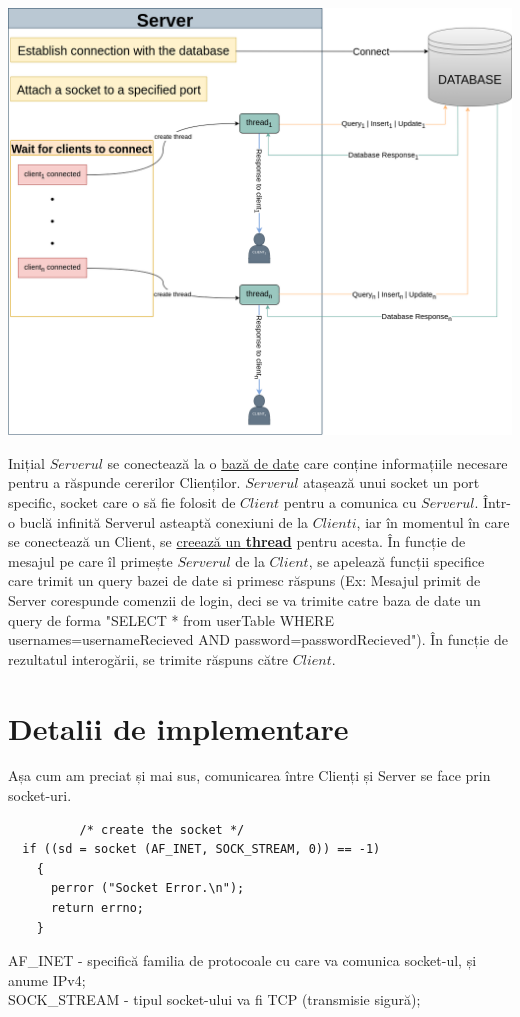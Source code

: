 \documentclass[runningheads]{llncs}
\begin{document}
\begin{center}
\includegraphics[scale=0.4]{diagram_server.png}
\label{sec:server}
\end{center}
Inițial $Serverul$ se conectează la o \hyperref[sec:ServerDataBase]{bază de date} care conține informațiile necesare pentru a răspunde cererilor Clienților.
$Serverul$ atașează unui socket un port specific, socket care o să fie folosit de $Client$ pentru a comunica cu $Serverul$. 
Într-o buclă infinită Serverul asteaptă conexiuni de la $Clienti$, iar în momentul în care se conectează un Client, se \hyperlink{sec:ServerCreateThread}{creează un \textbf{thread}} pentru acesta.
În funcție de mesajul pe care îl primește $Serverul$ de la $Client$, se apelează funcții specifice care trimit un query bazei de date si primesc răspuns
(Ex: Mesajul primit de Server corespunde comenzii de login, deci se va trimite catre baza de date un query de forma 
"SELECT * from userTable WHERE usernames=usernameRecieved AND password=passwordRecieved").
În funcție de rezultatul interogării, se trimite răspuns către $Client$.

\section{Detalii de implementare}
Așa cum am preciat și mai sus, comunicarea între Clienți și Server se face prin socket-uri.
     \begin{verbatim} 
          /* create the socket */
  if ((sd = socket (AF_INET, SOCK_STREAM, 0)) == -1)
    {
      perror ("Socket Error.\n");
      return errno;
    }
    \end{verbatim} 
AF\_INET - specifică familia de protocoale cu care va comunica socket-ul, și anume IPv4;\\
SOCK\_STREAM - tipul socket-ului va fi TCP (transmisie sigură);\\
\end{document}
